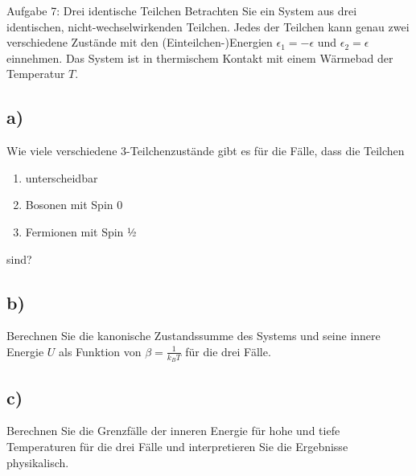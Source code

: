 \begin{aufgabe}{Aufgabe 7: Drei identische Teilchen}
    Betrachten Sie ein System aus drei identischen, nicht-wechselwirkenden Teilchen.
    Jedes der Teilchen kann genau zwei verschiedene Zustände mit den (Einteilchen-)Energien $\epsilon_1 = -\epsilon$ und $\epsilon_2 = \epsilon$ einnehmen.
    Das System ist in thermischem Kontakt mit einem Wärmebad der Temperatur $T$.

    \subsection{a)}
    Wie viele verschiedene 3-Teilchenzustände gibt es für die Fälle, dass die Teilchen
    \begin{enumerate}[label=(\roman*)]
        \item unterscheidbar
        \item Bosonen mit Spin 0
        \item Fermionen mit Spin ½
    \end{enumerate}
    sind?

    \subsection{b)}
    Berechnen Sie die kanonische Zustandssumme des Systems und seine innere Energie $U$ als Funktion von $\beta = \frac{1}{k_B T}$ für die drei Fälle.

    \subsection{c)}
    Berechnen Sie die Grenzfälle der inneren Energie für hohe und tiefe Temperaturen für die drei Fälle und interpretieren Sie die Ergebnisse physikalisch.
\end{aufgabe}


